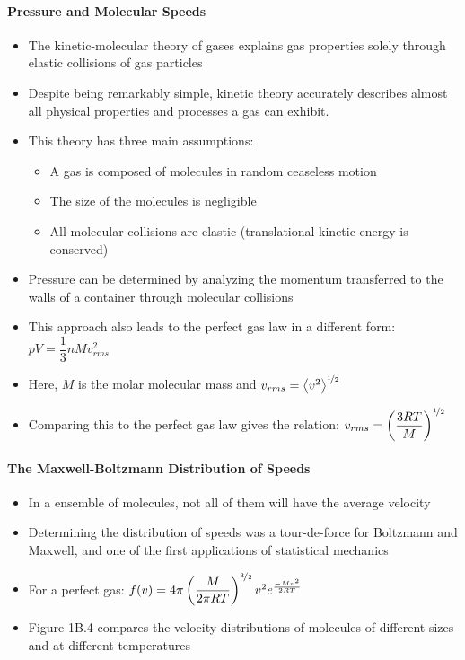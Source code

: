 \documentclass[12pt, openany, letterpaper]{memoir}
\begin{document}
\paragraph{Pressure and Molecular Speeds}
\begin{itemize}
	\item The kinetic-molecular theory of gases explains gas properties solely through elastic collisions of gas particles
	\item Despite being remarkably simple, kinetic theory accurately describes almost all physical properties and processes a gas can exhibit.
	\item This theory has three main assumptions:
	      \begin{itemize}
		      \item A gas is composed of molecules in random ceaseless motion
		      \item The size of the molecules is negligible
		      \item All molecular collisions are elastic (translational kinetic energy is conserved)
	      \end{itemize}
	\item Pressure can be determined by analyzing the momentum transferred to the walls of a container through molecular collisions
	\item This approach also leads to the perfect gas law in a different form: $pV=\dfrac{1}{3}nMv_{rms}^2$
	\item Here, $M$ is the molar molecular mass and $v_{rms}=\left< v^2 \right>^{\nicefrac{1}{2}}$
	\item Comparing this to the perfect gas law gives the relation: $v_{rms}=\left(\dfrac{3RT}{M}\right)^{\nicefrac{1}{2}}$
\end{itemize}
\paragraph{The Maxwell-Boltzmann Distribution of Speeds}
\begin{itemize}
	\item In a ensemble of molecules, not all of them will have the average velocity
	\item Determining the distribution of speeds was a tour-de-force for Boltzmann and Maxwell, and one of the first applications of statistical mechanics
	\item For a perfect gas: $f(v) = 4\pi\left(\dfrac{M}{2\pi RT}\right)^{\nicefrac{3}{2}}v^2e^{\frac{-Mv^2}{2RT}}$
	\item Figure 1B.4 compares the velocity distributions of molecules of different sizes and at different temperatures
\end{itemize}
\end{document}
